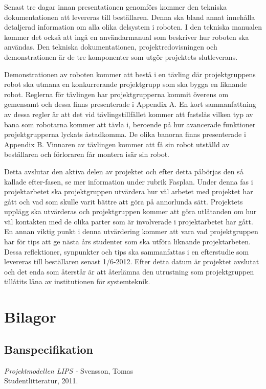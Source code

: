 \documentclass[a4paper,12pt]{article}
\begin{document}
Senast tre dagar innan presentationen genomförs kommer den tekniska dokumentationen att levereras till beställaren. Denna ska bland annat innehålla detaljerad information om alla olika delsystem i roboten. I den tekniska manualen kommer det också att ingå en användarmanual som beskriver hur roboten ska användas. Den tekniska dokumentationen, projektredovisningen och demonstrationen är de tre komponenter som utgör projektets slutleverans. 

Demonstrationen av roboten kommer att bestå i en tävling där projektgruppens robot ska utmana en konkurrerande projektgrupp som ska bygga en liknande robot. Reglerna för tävlingen har projektgrupperna kommit överens om gemensamt och dessa finns presenterade i Appendix A. En kort sammanfattning av dessa regler är att det vid tävlingstillfället kommer att fastslås vilken typ av bana som robotarna kommer att tävla i, beroende på hur avancerade funktioner projektgrupperna lyckats åstadkomma. De olika banorna finns presenterade i Appendix B. Vinnaren av tävlingen kommer att få sin robot utställd av beställaren och förloraren får montera isär sin robot.

Detta avslutar den aktiva delen av projektet och efter detta påbörjas den så kallade efter-fasen, se mer information under rubrik Fasplan. Under denna fas i projektarbetet ska  projektgruppen utvärdera hur väl arbetet med projektet har gått och vad som skulle varit bättre att göra på annorlunda sätt. Projektets upplägg ska utvärderas och projektgruppen kommer att göra utlåtanden om hur väl kontakten med de olika parter som är involverade i projektarbetet har gått. En annan viktig punkt i denna utvärdering kommer att vara vad projektgruppen har för tips att ge nästa års studenter som ska utföra liknande projektarbeten. Dessa reflektioner, synpunkter och tips ska sammanfattas i en efterstudie som levereras till beställaren senast 1/6-2012. Efter detta datum är projektet avslutat och det enda som återstår är att återlämna den utrustning som projektgruppen tillåtits låna av institutionen för systemteknik.


\newpage
\appendix
\section{Bilagor} \label{app:rules}


\subsection{Banspecifikation} \label{app:bana}

\newpage


\begin{thebibliography}{99}
\textit{Projektmodellen LIPS - } Svensson, Tomas
\\Studentlitteratur, 2011.
\end{thebibliography}
\end{document}
